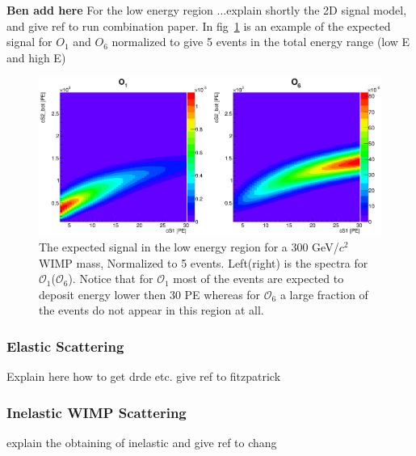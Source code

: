 \textbf{Ben add here} For the low energy region ...explain shortly the 2D signal model, and give ref to run combination paper. In fig~\ref{fig:LowE} is an example of the expected signal for $O_1$ and $O_6$ normalized to give 5 events in the total energy range (low E and high E)
\begin{figure}[h!]
\begin{minipage}{1.\linewidth}
\centerline{\includegraphics[width=1.\linewidth]{Figures/SigLowO1O6.eps}}
\end{minipage}
\caption{The expected signal in the low energy region for a 300 GeV/$c^2$ WIMP mass, Normalized to 5 events. Left(right) is the spectra for $\mathcal{O}_1$($\mathcal{O}_6$). Notice that for $\mathcal{O}_1$ most of the events are expected to deposit energy lower then 30 PE whereas for $\mathcal{O}_6$ a large fraction of the events do not appear in this region at all.}
\label{fig:LowE}
\end{figure}





\subsubsection{Elastic Scattering}
\label{subsubsec:Elastic}
Explain here how to get drde etc. give ref to fitzpatrick
\subsubsection{Inelastic WIMP Scattering}
\label{subsubsec:Inelastic}
explain the obtaining of inelastic and give ref to chang
